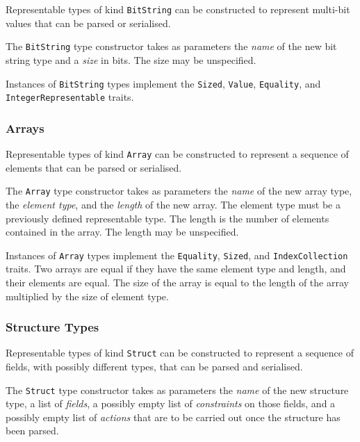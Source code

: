 \documentclass[10pt,twocolumn,a4paper]{article}
\newcommand{\code}[1]{\texttt{#1}}
\begin{document}
Representable types of kind \code{BitString} can be constructed to
represent multi-bit values that can be parsed or serialised.

The \code{BitString} type constructor takes as parameters the \emph{name}
of the new bit string type and a \emph{size} in bits. The size may be
unspecified. 

Instances of \code{BitString} types implement the \code{Sized}, \code{Value},
\code{Equality}, and \code{IntegerRepresentable} traits. 

\subsubsection{Arrays}

Representable types of kind \code{Array} can be constructed to represent
a sequence of elements that can be parsed or serialised.

The \code{Array} type constructor takes as parameters the \emph{name} of
the new array type, the \emph{element type}, and the \emph{length} of the
new array.
The element type must be a previously defined representable type.
The length is the number of elements contained in the array.
The length may be unspecified. 

Instances of \code{Array} types implement the \code{Equality}, \code{Sized},
and \code{IndexCollection} traits.
Two arrays are equal if they have the same element type and length, and
their elements are equal.
The size of the array is equal to the length of the array multiplied by the
size of element type.

\subsubsection{Structure Types}

Representable types of kind \code{Struct} can be constructed to represent
a sequence of fields, with possibly different types, that can be parsed
and serialised.

The \code{Struct} type constructor takes as parameters the \emph{name} of
the new structure type, a list of \emph{fields}, a possibly empty list of
\emph{constraints} on those fields, and a possibly empty list of
\emph{actions} that are to be carried out once the structure has been
parsed.
\end{document}
